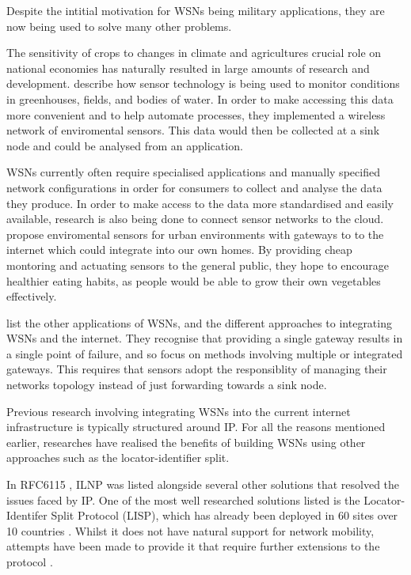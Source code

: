 \documentclass[12pt]{article}
\begin{document}
Despite the intitial motivation for WSNs being military applications, they are now being used to solve many other problems.

The sensitivity of crops to changes in climate and agricultures crucial role on national economies has naturally resulted in large amounts of research and development. \cite{agrisensor} describe how sensor technology is being used to monitor conditions in greenhouses, fields, and bodies of water. In order to make accessing this data more convenient and to help automate processes, they implemented a wireless network of enviromental sensors. This data would then be collected at a sink node and could be analysed from an application. 

WSNs currently often require specialised applications and manually specified network configurations in order for consumers to collect and analyse the data they produce. In order to make access to the data more standardised and easily available, research is also being done to connect sensor networks to the cloud. \cite{indoor} propose enviromental sensors for urban environments with gateways to to the internet which could integrate into our own homes. By providing cheap montoring and actuating sensors to the general public, they hope to encourage healthier eating habits, as people would be able to grow their own vegetables effectively. 

\cite{wsnlist} list the other applications of WSNs, and the different approaches to integrating WSNs and the internet. They recognise that providing a single gateway results in a single point of failure, and so focus on methods involving multiple or integrated gateways. This requires that sensors adopt the responsiblity of managing their networks topology instead of just forwarding towards a sink node. 

Previous research involving integrating WSNs into the current internet infrastructure is typically structured around IP. For all the reasons mentioned earlier, researches have realised the benefits of building WSNs using other approaches such as the locator-identifier split.

In RFC6115 \cite{rfc6115}, ILNP was listed alongside several other solutions that resolved the issues faced by IP. One of the most well researched solutions listed is the Locator-Identifer Split Protocol (LISP), which has already been deployed in 60 sites over 10 countries \cite{nahla}. Whilst it does not have natural support for network mobility, attempts have been made to provide it that require further extensions to the protocol \cite{moblisp}. 
\end{document}
